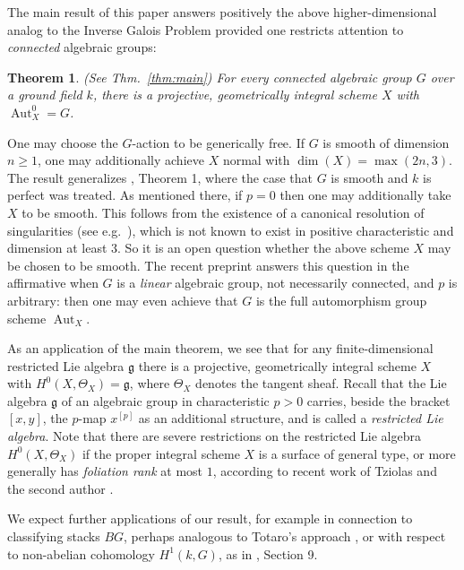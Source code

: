 \documentclass[oneside, 12pt]{amsart}
\newtheorem*{maintheorem}{Theorem}
\theoremstyle{definition}
\theoremstyle{remark}
\newcommand{\Aut}{\operatorname{Aut}}
\newcommand{\lieg}{\mathfrak{g}}
\begin{document}
The main result of this paper answers positively the above higher-dimensional
analog to the Inverse Galois Problem provided one restricts
attention to \emph{connected} algebraic groups:

\begin{maintheorem}
(See Thm.\ \ref{thm:main})
For every connected algebraic group $G$ over a ground field $k$, 
there is a projective,  geometrically integral scheme $X$ with $ \Aut_X^0= G$.
\end{maintheorem}
 
One may choose the $G$-action to be generically free. If $G$ is smooth 
of dimension $n\geq 1$, one may additionally achieve $X$ normal with 
$\dim(X)=\max(2n,3)$. 
The result generalizes \cite{Brion 2014}, Theorem 1,
where the case that $G$ is smooth and $k$ is perfect was treated.
As mentioned there, if $p = 0$ then one may additionally take $X$
to be smooth. This follows from the existence of a canonical 
resolution of singularities (see  e.g.~\cite{Kollar 2007}), 
which is not known to exist in positive characteristic and 
dimension at least $3$. So it is an open question whether
the above scheme $X$ may be chosen to be smooth. The recent
preprint \cite{Florence 2023} answers this question in the 
affirmative when $G$ is a \emph{linear} algebraic group,
not necessarily connected, and $p$ is arbitrary: 
then one may even achieve that $G$ is the full automorphism 
group scheme $\Aut_X$.

As an application of the main theorem,
we see that for any finite-dimensional restricted Lie algebra $\lieg$ 
there is a projective, geometrically integral scheme $X$ 
with $H^0(X,\Theta_X)=\lieg$, where $\Theta_X$ denotes the tangent sheaf. 
Recall that the Lie algebra $\lieg$ of an algebraic group in characteristic $p>0$
carries, beside the bracket $[x,y]$, the $p$-map $x^{[p]}$ as an additional structure,  and is called a \emph{restricted Lie algebra}.
Note that there are severe restrictions on the restricted Lie algebra
$H^0(X,\Theta_X)$ if the proper integral scheme $X$ is a surface of general type,
or more generally has \emph{foliation rank}  at most $1$, according to recent work
of Tziolas and the second author \cite{Schroeer; Tziolas 2023}.

We expect further applications of our result, for example in connection to classifying stacks $BG$, 
perhaps analogous to Totaro's approach \cite{Totaro 1999}, 
or with respect to non-abelian cohomology $H^1(k,G)$, as in \cite{Hilario; Schroeer 2023}, Section 9.
\end{document}

